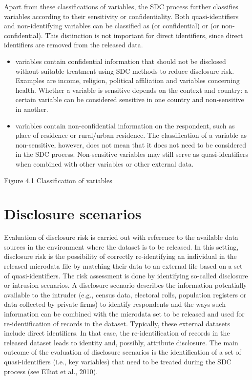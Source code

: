 \documentclass[letterpaper,10pt,english]{sphinxmanual}
\begin{document}
Apart from these classifications of variables, the SDC process further
classifies variables according to their sensitivity or confidentiality.
Both quasi-identifiers and non-identifying variables can be classified
as  (or confidential) or  (or
non-confidential). This distinction is not important for direct
identifiers, since direct identifiers are removed from the released
data.
\begin{itemize}
\item {} 
 variables contain confidential information that should
not be disclosed without suitable treatment using SDC methods to
reduce disclosure risk. Examples are income, religion, political
affiliation and variables concerning health. Whether a variable is
sensitive depends on the context and country: a certain variable can
be considered sensitive in one country and non-sensitive in another.

\item {} 
 variables contain non-confidential information on
the respondent, such as place of residence or rural/urban residence.
The classification of a variable as non-sensitive, however, does not
mean that it does not need to be considered in the SDC process.
Non-sensitive variables may still serve as quasi-identifiers when
combined with other variables or other external data.

\end{itemize}

Figure 4.1 Classification of variables


\section{Disclosure scenarios}
\label{\detokenize{measure_risk:disclosure-scenarios}}
Evaluation of disclosure risk is carried out with reference to the
available data sources in the environment where the dataset is to be
released. In this setting, disclosure risk is the possibility of
correctly re-identifying an individual in the released microdata file by
matching their data to an external file based on a set of
quasi-identifiers. The risk assessment is done by identifying so-called
disclosure or intrusion scenarios. A disclosure scenario describes the
information potentially available to the intruder (e.g., census data,
electoral rolls, population registers or data collected by private
firms) to identify respondents and the ways such information can be
combined with the microdata set to be released and used for
re-identification of records in the dataset. Typically, these external
datasets include direct identifiers. In that case, the re-identification
of records in the released dataset leads to identity and, possibly,
attribute disclosure. The main outcome of the evaluation of disclosure
scenarios is the identification of a set of quasi-identifiers (i.e., key
variables) that need to be treated during the SDC process (see Elliot et
al., 2010).
\end{document}
